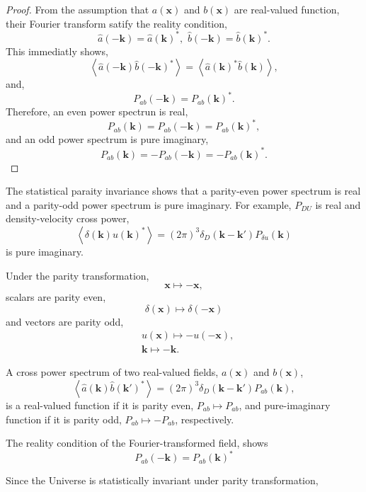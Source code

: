 \documentclass[a4paper,11pt, fleqn]{article}
\begin{document}
\begin{proof}
  From the assumption that $a(\bm{x})$ and $b(\bm{x})$ are real-valued
  function, their Fourier transform satify the reality condition,
  \begin{equation}
    \hat{a}(-\bm{k}) = \hat{a}(\bm{k})^*, \,\,
    \hat{b}(-\bm{k}) = \hat{b}(\bm{k})^*.
  \end{equation}
  This immediatly shows,
  \begin{equation}
    \left\langle \hat{a}(-\bm{k}) \hat{b}(-\bm{k})^* \right\rangle
    = \left\langle \hat{a}(\bm{k})^* \hat{b}(\bm{k}) \right\rangle,
  \end{equation}
  and,
  \begin{equation}
    P_{ab}(-\bm{k}) = P_{ab}(\bm{k})^*.
  \end{equation}
  Therefore, an even power spectrun is real,
  \begin{equation}
    P_{ab}(\bm{k}) = P_{ab}(-\bm{k}) = P_{ab}(\bm{k})^*,
  \end{equation}
  and an odd power spectrum is pure imaginary,
  \begin{equation}
    P_{ab}(\bm{k}) = -P_{ab}(-\bm{k}) = -P_{ab}(\bm{k})^*.
  \end{equation}
\end{proof}


The statistical paraity invariance shows that a parity-even power
spectrum is real and a parity-odd power spectrum is pure
imaginary. For example, $P_{DU}$ is real and density-velocity cross power,
%
\begin{equation}
  \left\langle \delta(\bm{k}) u(\bm{k})^* \right\rangle
  = (2\pi)^3 \delta_D(\bm{k} - \bm{k}') P_{\delta u}(\bm{k})
\end{equation}
%
is pure imaginary.

Under the parity transformation,
%
\begin{equation}
  \bm{x} \mapsto -\bm{x},
\end{equation}
scalars are parity even,
%
\begin{equation}
  \delta(\bm{x}) \mapsto \delta(-\bm{x})
\end{equation}
%
and vectors are parity odd,
%
\begin{align}
  &u(\bm{x}) \mapsto -u(-\bm{x}),\\
  &\bm{k} \mapsto - \bm{k}.
\end{align}
%

A cross power spectrum of two real-valued fields,
$a(\bm{x})$ and $b(\bm{x})$,
%
\begin{equation}
  \left\langle \hat{a}(\bm{k}) \hat{b}(\bm{k}')^* \right\rangle
  = (2\pi)^3 \delta_D(\bm{k} - \bm{k}') P_{ab}(\bm{k}),
\end{equation}
%
is a real-valued function if it is parity even, $P_{ab} \mapsto P_{ab}$, and
pure-imaginary function if it is parity odd, $P_{ab} \mapsto -P_{ab}$, respectively.

The reality condition of the Fourier-transformed field,
shows
\begin{equation}
  P_{ab}(-\bm{k}) = P_{ab}(\bm{k})^*
\end{equation}

  
Since the Universe is statistically invariant under parity transformation,
\end{document}
